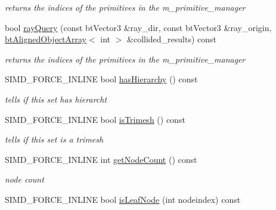 \begin{CompactItemize}
\begin{CompactList}\small\item\em returns the indices of the primitives in the m\_\-primitive\_\-manager \item\end{CompactList}\item 
\hypertarget{classbt_g_impact_bvh_370a3ad672c83a0fee3afe16c4428b16}{
bool \hyperlink{classbt_g_impact_bvh_370a3ad672c83a0fee3afe16c4428b16}{rayQuery} (const btVector3 \&ray\_\-dir, const btVector3 \&ray\_\-origin, \hyperlink{classbt_aligned_object_array}{btAlignedObjectArray}$<$ int $>$ \&collided\_\-results) const }
\label{classbt_g_impact_bvh_370a3ad672c83a0fee3afe16c4428b16}

\begin{CompactList}\small\item\em returns the indices of the primitives in the m\_\-primitive\_\-manager \item\end{CompactList}\item 
\hypertarget{classbt_g_impact_bvh_ae41f199ec288b51dc4882c39603c349}{
SIMD\_\-FORCE\_\-INLINE bool \hyperlink{classbt_g_impact_bvh_ae41f199ec288b51dc4882c39603c349}{hasHierarchy} () const }
\label{classbt_g_impact_bvh_ae41f199ec288b51dc4882c39603c349}

\begin{CompactList}\small\item\em tells if this set has hierarcht \item\end{CompactList}\item 
\hypertarget{classbt_g_impact_bvh_b4c32987d962f62a97ae3082bdfef147}{
SIMD\_\-FORCE\_\-INLINE bool \hyperlink{classbt_g_impact_bvh_b4c32987d962f62a97ae3082bdfef147}{isTrimesh} () const }
\label{classbt_g_impact_bvh_b4c32987d962f62a97ae3082bdfef147}

\begin{CompactList}\small\item\em tells if this set is a trimesh \item\end{CompactList}\item 
\hypertarget{classbt_g_impact_bvh_c0309a1e5cb9d087c8e39b1c44c76f5b}{
SIMD\_\-FORCE\_\-INLINE int \hyperlink{classbt_g_impact_bvh_c0309a1e5cb9d087c8e39b1c44c76f5b}{getNodeCount} () const }
\label{classbt_g_impact_bvh_c0309a1e5cb9d087c8e39b1c44c76f5b}

\begin{CompactList}\small\item\em node count \item\end{CompactList}\item 
\hypertarget{classbt_g_impact_bvh_6580f9e8fa175957b66a7bbe87adcf42}{
SIMD\_\-FORCE\_\-INLINE bool \hyperlink{classbt_g_impact_bvh_6580f9e8fa175957b66a7bbe87adcf42}{isLeafNode} (int nodeindex) const }
\label{classbt_g_impact_bvh_6580f9e8fa175957b66a7bbe87adcf42}


\end{CompactItemize}
